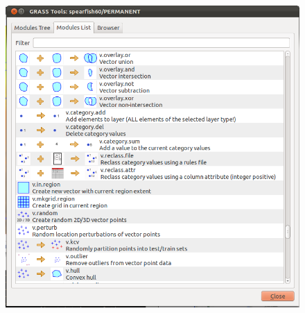 \begin{figure}[htbp]
   \centering
   \includegraphics[scale=0.25]{qgis032.png}
   \caption{}
   \label{fig:qgis032}
\end{figure}

